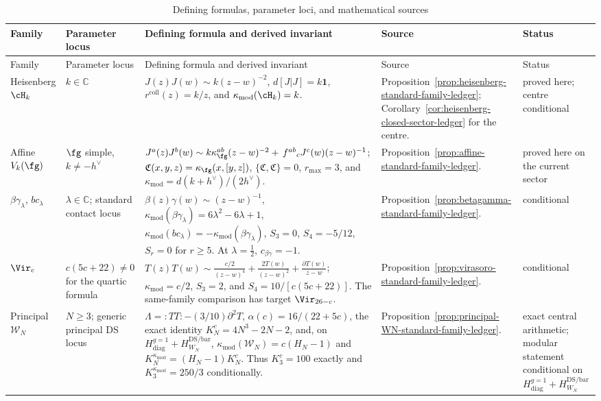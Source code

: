 {\scriptsize
\renewcommand{\arraystretch}{1.18}
\begin{longtable}{@{}p{}p{}p{}p{}p{}@{}}
\caption{Defining formulas, parameter loci, and mathematical sources}
\label{tab:standard-family-status}\\
\toprule
Family & Parameter locus & Defining formula and derived invariant &
Source & Status \\
\midrule
\endfirsthead
\toprule
Family & Parameter locus & Defining formula and derived invariant &
Source & Status \\
\midrule
\endhead
Heisenberg \(\cH_k\) &
\(k\in\mathbb C\) &
\(J(z)J(w)\sim k(z-w)^{-2}\),
\(d[J|J]=k\mathbf1\),
\(r^{\mathrm{coll}}(z)=k/z\), and
\(\kappa_{\mathrm{mod}}(\cH_k)=k\). &
Proposition~\ref{prop:heisenberg-standard-family-ledger};
Corollary~\ref{cor:heisenberg-closed-sector-ledger} for the centre. &
proved here; centre conditional \\

Affine \(V_k(\fg)\) &
\(\fg\) simple, \(k\ne-h^\vee\) &
\(J^a(z)J^b(w)\sim
k\kappa_\fg^{ab}(z-w)^{-2}
+\,
f^{ab}{}_cJ^c(w)(z-w)^{-1}\);
\(\mathfrak C(x,y,z)=\kappa_\fg(x,[y,z])\),
\(\{\mathfrak C,\mathfrak C\}=0\),
\(r_{\max}=3\), and
\(\kappa_{\mathrm{mod}}=d(k+h^\vee)/(2h^\vee)\). &
Proposition~\ref{prop:affine-standard-family-ledger}. &
proved here on the current sector \\

\(\beta\gamma_\lambda\), \(bc_\lambda\) &
\(\lambda\in\mathbb C\); standard contact locus &
\(\beta(z)\gamma(w)\sim(z-w)^{-1}\),
\(\kappa_{\mathrm{mod}}(\beta\gamma_\lambda)=6\lambda^2-6\lambda+1\),
\(\kappa_{\mathrm{mod}}(bc_\lambda)
=-\kappa_{\mathrm{mod}}(\beta\gamma_\lambda)\),
\(S_3=0\), \(S_4=-5/12\), \(S_r=0\) for \(r\ge5\).
At \(\lambda=\tfrac12\), \(c_{\beta\gamma}=-1\). &
Proposition~\ref{prop:betagamma-standard-family-ledger}. &
conditional \\

\(\Vir_c\) &
\(c(5c+22)\ne0\) for the quartic formula &
\(T(z)T(w)\sim
\frac{c/2}{(z-w)^4}+\frac{2T(w)}{(z-w)^2}
+\frac{\partial T(w)}{z-w}\);
\(\kappa_{\mathrm{mod}}=c/2\), \(S_3=2\), and
\(S_4=10/[c(5c+22)]\).
The same-family comparison has target \(\Vir_{26-c}\). &
Proposition~\ref{prop:virasoro-standard-family-ledger}. &
conditional \\

Principal \(\mathcal W_N\) &
\(N\ge3\); generic principal DS locus &
\(\Lambda={:}TT{:}-(3/10)\partial^2T\),
\(\alpha(c)=16/(22+5c)\),
the exact identity \(K_N^c=4N^3-2N-2\), and, on
\(H_{\mathrm{diag}}^{g=1}+H_{W_N}^{\mathrm{DS/bar}}\),
\(\kappa_{\mathrm{mod}}(\mathcal W_N)=c(H_N-1)\) and
\(K_N^{\kappa_{\mathrm{mod}}}=(H_N-1)K_N^c\).
Thus \(K_3^c=100\) exactly and
\(K_3^{\kappa_{\mathrm{mod}}}=250/3\) conditionally. &
Proposition~\ref{prop:principal-WN-standard-family-ledger}. &
exact central arithmetic; modular statement conditional on
\(H_{\mathrm{diag}}^{g=1}+H_{W_N}^{\mathrm{DS/bar}}\) \\


\end{longtable}}
